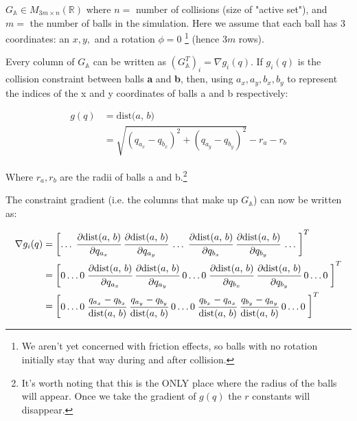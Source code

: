 \documentclass[12pt]{article}
\newcommand{\GA}{G_{\mathbb{A}}}
\newcommand{\pd}[2]{\cfrac{\partial{#1}}{\partial{#2}}}
\newcommand{\dist}[2]{\text{dist(} #1 \text{, } #2 \text{)}}
\begin{document}
$\GA \in M_{3m \times n}(\mathbb{R})$
where $n = $ number of collisions (size of "active set"),
and $m = $ the number of balls in the simulation.
Here we assume that each ball has 3 coordinates: an $x, y,$ and a rotation $\phi = 0$
\footnote{
    We aren't yet concerned with friction effects,
    so balls with no rotation initially stay that way during and after collision.
}
(hence $3m$ rows).

Every column of $\GA$ can be written as $(\GA^T)_i = \nabla g_i(q)$.
If $g_i(q)$ is the collision constraint between balls \textbf{a} and \textbf{b},
then, using $a_x, a_y, b_x, b_y$ to represent the indices of the x and y coordinates
of balls a and b respectively:

\begin{align*}
    g(q)    &= \dist{a}{b} \\
            &= \sqrt{(q_{a_x} - q_{b_x})^2 + (q_{a_y} - q_{b_y})^2} - r_a - r_b
\end{align*}

Where $r_a, r_b$ are the radii of balls a and b.\footnote{It's worth noting that this is
the ONLY place where the radius of the balls will appear. Once we take the gradient of $g(q)$
the $r$ constants will disappear.}

The constraint gradient (i.e. the columns that make up $\GA$) can now be written as:

\begin{align*}
    \nabla g_i(q)
        &= \begin{bmatrix}
            \dots \;
            \pd{\dist{a}{b}}{q_{a_x}} \; \pd{\dist{a}{b}}{q_{a_y}} \;
            \dots \;
            \pd{\dist{a}{b}}{q_{b_x}} \; \pd{\dist{a}{b}}{q_{b_y}} \;
            \dots \;
        \end{bmatrix}^T \\
        &= \begin{bmatrix}
            0 \dots  0 \;
            \pd{\dist{a}{b}}{q_{a_x}} \; \pd{\dist{a}{b}}{q_{a_y}} \;
            0 \dots 0 \;
            \pd{\dist{a}{b}}{q_{b_x}} \; \pd{\dist{a}{b}}{q_{b_y}} \;
            0 \dots 0 \;
        \end{bmatrix}^T \\
        &= \begin{bmatrix}
            0 \dots 0 \;
            \cfrac{q_{a_x} - q_{b_x}}{\dist{a}{b}} \; \cfrac{q_{a_y} - q_{b_y}}{\dist{a}{b}} \;
            0 \dots 0 \;
            \cfrac{q_{b_x} - q_{a_x}}{\dist{a}{b}} \; \cfrac{q_{b_y} - q_{a_y}}{\dist{a}{b}} \;
            0 \dots 0 \;
        \end{bmatrix}^T
\end{align*}
\end{document}

